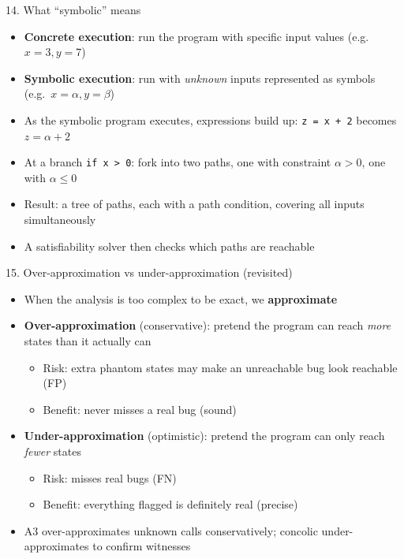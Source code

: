 \documentclass[aspectratio=169]{beamer}
\begin{document}
\begin{frame}{14. What ``symbolic'' means}
\begin{itemize}
  \item \textbf{Concrete execution}: run the program with specific input values (e.g.\ \(x=3, y=7\))
  \item \textbf{Symbolic execution}: run with \emph{unknown} inputs represented as symbols (e.g.\ \(x=\alpha, y=\beta\))
  \item As the symbolic program executes, expressions build up: \texttt{z = x + 2} becomes \(z = \alpha + 2\)
  \item At a branch \texttt{if x > 0}: fork into two paths, one with constraint \(\alpha > 0\), one with \(\alpha \le 0\)
  \item Result: a tree of paths, each with a path condition, covering all inputs simultaneously
  \item A satisfiability solver then checks which paths are reachable
\end{itemize}
\end{frame}

\begin{frame}{15. Over-approximation vs under-approximation (revisited)}
\begin{itemize}
  \item When the analysis is too complex to be exact, we \textbf{approximate}
  \item \textbf{Over-approximation} (conservative): pretend the program can reach \emph{more} states than it actually can
    \begin{itemize}
      \item Risk: extra phantom states may make an unreachable bug look reachable (FP)
      \item Benefit: never misses a real bug (sound)
    \end{itemize}
  \item \textbf{Under-approximation} (optimistic): pretend the program can only reach \emph{fewer} states
    \begin{itemize}
      \item Risk: misses real bugs (FN)
      \item Benefit: everything flagged is definitely real (precise)
    \end{itemize}
  \item A3 over-approximates unknown calls conservatively; concolic under-approximates to confirm witnesses
\end{itemize}
\end{frame}
\end{document}
